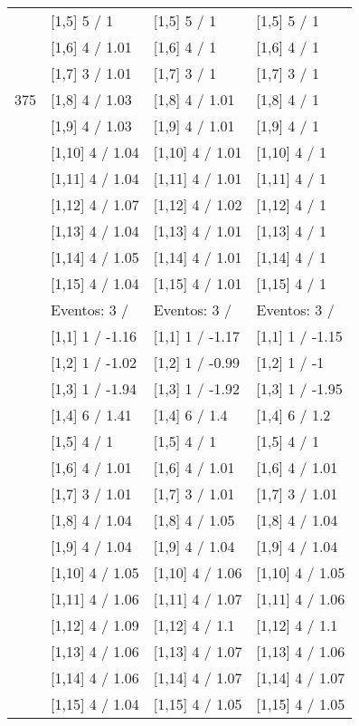 \begin{table}
\begin{tabular}[t]{llll}
 & {}[1,5] 5  / 1 & {}[1,5] 5  / 1 & {}[1,5] 5  / 1\\
 & {}[1,6] 4  / 1.01 & {}[1,6] 4  / 1 & {}[1,6] 4  / 1\\
 & {}[1,7] 3  / 1.01 & {}[1,7] 3  / 1 & {}[1,7] 3  / 1\\
375 & {}[1,8] 4  / 1.03 & {}[1,8] 4  / 1.01 & {}[1,8] 4  / 1\\
\addlinespace
 & {}[1,9] 4  / 1.03 & {}[1,9] 4  / 1.01 & {}[1,9] 4  / 1\\
 & {}[1,10] 4  / 1.04 & {}[1,10] 4  / 1.01 & {}[1,10] 4  / 1\\
 & {}[1,11] 4  / 1.04 & {}[1,11] 4  / 1.01 & {}[1,11] 4  / 1\\
 & {}[1,12] 4  / 1.07 & {}[1,12] 4  / 1.02 & {}[1,12] 4  / 1\\
 & {}[1,13] 4  / 1.04 & {}[1,13] 4  / 1.01 & {}[1,13] 4  / 1\\
\addlinespace
 & {}[1,14] 4  / 1.05 & {}[1,14] 4  / 1.01 & {}[1,14] 4  / 1\\
 & {}[1,15] 4  / 1.04 & {}[1,15] 4  / 1.01 & {}[1,15] 4  / 1\\
 & Eventos:  3 / & Eventos:  3 / & Eventos:  3 /\\
 & {}[1,1] 1  / -1.16 & {}[1,1] 1  / -1.17 & {}[1,1] 1  / -1.15\\
 & {}[1,2] 1  / -1.02 & {}[1,2] 1  / -0.99 & {}[1,2] 1  / -1\\
\addlinespace
 & {}[1,3] 1  / -1.94 & {}[1,3] 1  / -1.92 & {}[1,3] 1  / -1.95\\
 & {}[1,4] 6  / 1.41 & {}[1,4] 6  / 1.4 & {}[1,4] 6  / 1.2\\
 & {}[1,5] 4  / 1 & {}[1,5] 4  / 1 & {}[1,5] 4  / 1\\
 & {}[1,6] 4  / 1.01 & {}[1,6] 4  / 1.01 & {}[1,6] 4  / 1.01\\
 & {}[1,7] 3  / 1.01 & {}[1,7] 3  / 1.01 & {}[1,7] 3  / 1.01\\
\addlinespace
500 & {}[1,8] 4  / 1.04 & {}[1,8] 4  / 1.05 & {}[1,8] 4  / 1.04\\
 & {}[1,9] 4  / 1.04 & {}[1,9] 4  / 1.04 & {}[1,9] 4  / 1.04\\
 & {}[1,10] 4  / 1.05 & {}[1,10] 4  / 1.06 & {}[1,10] 4  / 1.05\\
 & {}[1,11] 4  / 1.06 & {}[1,11] 4  / 1.07 & {}[1,11] 4  / 1.06\\
 & {}[1,12] 4  / 1.09 & {}[1,12] 4  / 1.1 & {}[1,12] 4  / 1.1\\
\addlinespace
 & {}[1,13] 4  / 1.06 & {}[1,13] 4  / 1.07 & {}[1,13] 4  / 1.06\\
 & {}[1,14] 4  / 1.06 & {}[1,14] 4  / 1.07 & {}[1,14] 4  / 1.07\\
 & {}[1,15] 4  / 1.04 & {}[1,15] 4  / 1.05 & {}[1,15] 4  / 1.05\\
\bottomrule
\end{tabular}
\end{table}
